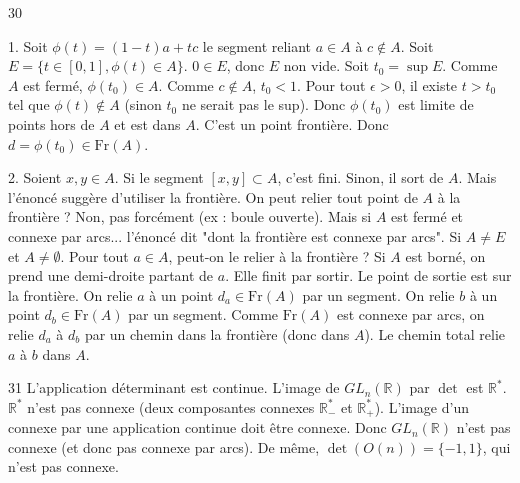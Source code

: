 \begin{correction}{30}

1. Soit $\phi(t) = (1-t)a + tc$ le segment reliant $a \in A$ à $c \notin A$.
Soit $E = \{ t \in [0,1], \phi(t) \in A \}$. $0 \in E$, donc $E$ non vide.
Soit $t_{0} = \sup E$.
Comme $A$ est fermé, $\phi(t_{0}) \in A$.
Comme $c \notin A$, $t_{0} < 1$.
Pour tout $\epsilon > 0$, il existe $t > t_{0}$ tel que $\phi(t) \notin A$ (sinon $t_{0}$ ne serait pas le sup).
Donc $\phi(t_{0})$ est limite de points hors de $A$ et est dans $A$.
C'est un point frontière. Donc $d = \phi(t_{0}) \in \text{Fr}(A)$.

2. Soient $x, y \in A$.
Si le segment $[x,y] \subset A$, c'est fini.
Sinon, il sort de $A$. Mais l'énoncé suggère d'utiliser la frontière.
On peut relier tout point de $A$ à la frontière ? Non, pas forcément (ex : boule ouverte).
Mais si $A$ est fermé et connexe par arcs... l'énoncé dit "dont la frontière est connexe par arcs".
Si $A \neq E$ et $A \neq \emptyset$.
Pour tout $a \in A$, peut-on le relier à la frontière ?
Si $A$ est borné, on prend une demi-droite partant de $a$. Elle finit par sortir. Le point de sortie est sur la frontière.
On relie $a$ à un point $d_{a} \in \text{Fr}(A)$ par un segment.
On relie $b$ à un point $d_{b} \in \text{Fr}(A)$ par un segment.
Comme $\text{Fr}(A)$ est connexe par arcs, on relie $d_{a}$ à $d_{b}$ par un chemin dans la frontière (donc dans $A$).
Le chemin total relie $a$ à $b$ dans $A$.
\end{correction}

\begin{correction}{31}
L'application déterminant est continue.
L'image de $GL_{n}(\mathbb{R})$ par $\det$ est $\mathbb{R}^{*}$.
$\mathbb{R}^{*}$ n'est pas connexe (deux composantes connexes $\mathbb{R}_{-}^{*}$ et $\mathbb{R}_{+}^{*}$).
L'image d'un connexe par une application continue doit être connexe.
Donc $GL_{n}(\mathbb{R})$ n'est pas connexe (et donc pas connexe par arcs).
De même, $\det(O(n)) = \{-1, 1\}$, qui n'est pas connexe.
\end{correction}

